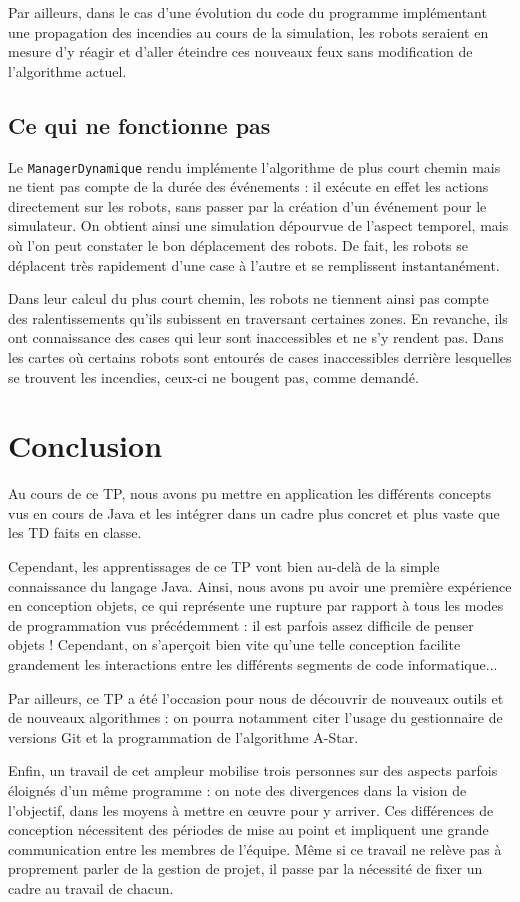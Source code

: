 \documentclass[a4paper,11pt]{article}
\begin{document}
Par ailleurs, dans le cas d'une évolution du code du programme implémentant une propagation des incendies au cours de la simulation, les robots seraient en mesure d'y réagir et d'aller éteindre ces nouveaux feux sans modification de l'algorithme actuel.

\subsection{Ce qui ne fonctionne pas}
Le \texttt{ManagerDynamique} rendu implémente l'algorithme de plus court chemin mais ne tient pas compte de la durée des événements : il exécute en effet les actions directement sur les robots, sans passer par la création d'un événement pour le simulateur. On obtient ainsi une simulation dépourvue de l'aspect temporel, mais où l'on peut constater le bon déplacement des robots. De fait, les robots se déplacent très rapidement d'une case à l'autre et se remplissent instantanément.

Dans leur calcul du plus court chemin, les robots ne tiennent ainsi pas compte des ralentissements qu'ils subissent en traversant certaines zones. En revanche, ils ont connaissance des cases qui leur sont inaccessibles et ne s'y rendent pas. Dans les cartes où certains robots sont entourés de cases inaccessibles derrière lesquelles se trouvent les incendies, ceux-ci ne bougent pas, comme demandé.

\section*{Conclusion}
Au cours de ce TP, nous avons pu mettre en application les différents concepts vus en cours de Java et les intégrer dans un cadre plus concret et plus vaste que les TD faits en classe.

Cependant, les apprentissages de ce TP vont bien au-delà de la simple connaissance du langage Java. Ainsi, nous avons pu avoir une première expérience en conception objets, ce qui représente une rupture par rapport à tous les modes de programmation vus précédemment : il est parfois assez difficile de penser objets ! Cependant, on s'aperçoit bien vite qu'une telle conception facilite grandement les interactions entre les différents segments de code informatique...

Par ailleurs, ce TP a été l'occasion pour nous de découvrir de nouveaux outils et de nouveaux algorithmes : on pourra notamment citer l'usage du gestionnaire de versions Git et la programmation de l'algorithme A-Star.

Enfin, un travail de cet ampleur mobilise trois personnes sur des aspects parfois éloignés d'un même programme : on note des divergences dans la vision de l'objectif, dans les moyens à mettre en \oe uvre pour y arriver. Ces différences de conception nécessitent des périodes de mise au point et impliquent une grande communication entre les membres de l'équipe. Même si ce travail ne relève pas à proprement parler de la gestion de projet, il passe par la nécessité de fixer un cadre au travail de chacun.
\end{document}

